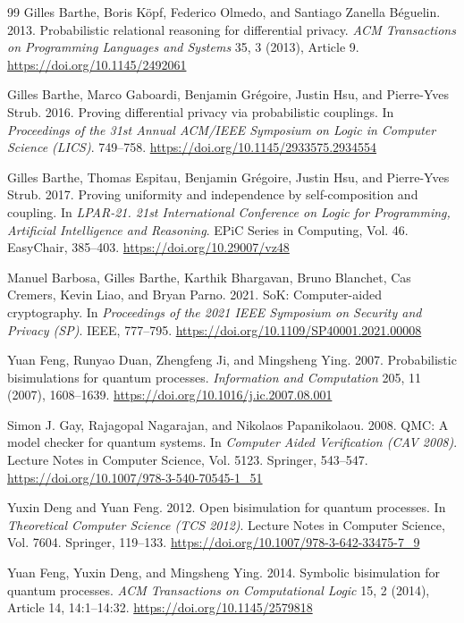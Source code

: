 \documentclass[conference,compsoc]{IEEEtran}
\begin{document}
\begin{thebibliography}{99}
Gilles Barthe, Boris K\"opf, Federico Olmedo, and Santiago Zanella B\'eguelin.
2013.
Probabilistic relational reasoning for differential privacy.
\emph{ACM Transactions on Programming Languages and Systems} 35, 3 (2013), Article 9.
\url{https://doi.org/10.1145/2492061}

Gilles Barthe, Marco Gaboardi, Benjamin Gr\'egoire, Justin Hsu, and Pierre-Yves Strub.
2016.
Proving differential privacy via probabilistic couplings.
In \emph{Proceedings of the 31st Annual ACM/IEEE Symposium on Logic in Computer Science (LICS)}. 749--758.
\url{https://doi.org/10.1145/2933575.2934554}

Gilles Barthe, Thomas Espitau, Benjamin Gr\'egoire, Justin Hsu, and Pierre-Yves Strub.
2017.
Proving uniformity and independence by self-composition and coupling.
In \emph{LPAR-21. 21st International Conference on Logic for Programming, Artificial Intelligence and Reasoning}. EPiC Series in Computing, Vol. 46. EasyChair, 385--403.
\url{https://doi.org/10.29007/vz48}

Manuel Barbosa, Gilles Barthe, Karthik Bhargavan, Bruno Blanchet, Cas Cremers, Kevin Liao, and Bryan Parno.
2021.
SoK: Computer-aided cryptography.
In \emph{Proceedings of the 2021 IEEE Symposium on Security and Privacy (SP)}. IEEE, 777--795.
\url{https://doi.org/10.1109/SP40001.2021.00008}

Yuan Feng, Runyao Duan, Zhengfeng Ji, and Mingsheng Ying.
2007.
Probabilistic bisimulations for quantum processes.
\emph{Information and Computation} 205, 11 (2007), 1608--1639.
\url{https://doi.org/10.1016/j.ic.2007.08.001}

Simon J. Gay, Rajagopal Nagarajan, and Nikolaos Papanikolaou.
2008.
QMC: A model checker for quantum systems.
In \emph{Computer Aided Verification (CAV 2008)}. Lecture Notes in Computer Science, Vol. 5123. Springer, 543--547.
\url{https://doi.org/10.1007/978-3-540-70545-1_51}

Yuxin Deng and Yuan Feng.
2012.
Open bisimulation for quantum processes.
In \emph{Theoretical Computer Science (TCS 2012)}. Lecture Notes in Computer Science, Vol. 7604. Springer, 119--133.
\url{https://doi.org/10.1007/978-3-642-33475-7_9}

Yuan Feng, Yuxin Deng, and Mingsheng Ying.
2014.
Symbolic bisimulation for quantum processes.
\emph{ACM Transactions on Computational Logic} 15, 2 (2014), Article 14, 14:1--14:32.
\url{https://doi.org/10.1145/2579818}


\end{thebibliography}
\end{document}
